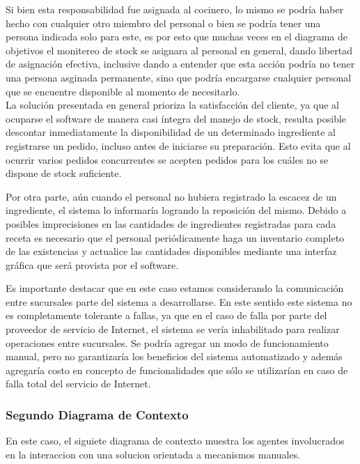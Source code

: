 \documentclass[a4paper,10pt]{article}
\begin{document}
Si bien esta responsabilidad fue asignada al cocinero, lo mismo se podr\'ia haber hecho con cualquier otro miembro del personal o bien se podr\'ia tener una persona indicada solo para este, es por esto que muchas veces en el diagrama de objetivos el monitereo de stock se asignara al personal en general, dando libertad de asignaci\'on efectiva, inclusive dando a entender que esta acci\'on podr\'ia no tener una persona asginada permanente, sino que podr\'ia encargarse cualquier personal que se encuentre disponible al momento de necesitarlo.
\\

La solución presentada en general prioriza la satisfacción del cliente, ya que al ocuparse el software de manera casi íntegra del manejo de stock, resulta posible descontar inmediatamente la disponibilidad de un determinado ingrediente al registrarse un pedido, incluso antes de iniciarse su preparación. Esto evita que al ocurrir varios pedidos concurrentes se acepten pedidos para los cuáles no se dispone de stock suficiente.

Por otra parte, aún cuando el personal no hubiera registrado la escacez de un ingrediente, el sistema lo informaría logrando la reposición del mismo. Debido a posibles imprecisiones en las cantidades de ingredientes registradas para cada receta es necesario que el personal periódicamente haga un inventario completo de las existencias y actualice las cantidades disponibles mediante una interfaz gráfica que será provista por el software.

Es importante destacar que en este caso estamos considerando la comunicación entre sucursales parte del sistema a desarrollarse. En este sentido este sistema no es completamente tolerante a fallas, ya que en el caso de falla por parte del proveedor de servicio de Internet, el sistema se vería inhabilitado para realizar operaciones entre sucursales. Se podría agregar un modo de funcionamiento manual, pero no garantizaría los beneficios del sistema automatizado y además agregaría costo en concepto de funcionalidades que sólo se utilizarían en caso de falla total del servicio de Internet. 



\subsubsection*{Segundo Diagrama de Contexto}

En este caso, el siguiete diagrama de contexto muestra los agentes involucrados en la interaccion con una solucion orientada a mecanismos manuales.
\end{document}
